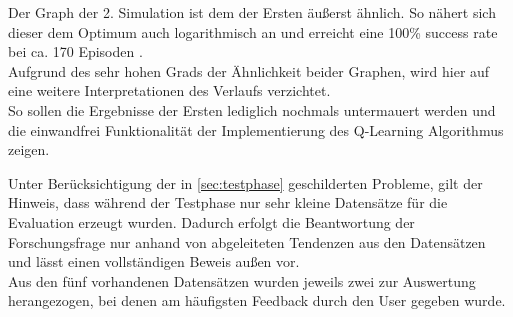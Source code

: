 Der Graph der 2. Simulation ist dem der Ersten äußerst ähnlich. So nähert sich dieser dem Optimum auch logarithmisch an und erreicht eine 100\% success rate bei ca. 170 Episoden .\\
Aufgrund des sehr hohen Grads der Ähnlichkeit beider Graphen, wird hier auf eine weitere Interpretationen des Verlaufs verzichtet. \\
So sollen die Ergebnisse der Ersten lediglich nochmals untermauert werden und die einwandfrei Funktionalität der Implementierung des Q-Learning Algorithmus zeigen. 

Unter Berücksichtigung der in \ref{sec:testphase} geschilderten Probleme, gilt der Hinweis, dass während der Testphase nur sehr kleine Datensätze für die Evaluation erzeugt wurden. Dadurch erfolgt die Beantwortung der Forschungsfrage nur anhand von abgeleiteten Tendenzen aus den Datensätzen und lässt einen vollständigen Beweis außen vor.  \\
Aus den fünf vorhandenen Datensätzen wurden jeweils zwei zur Auswertung herangezogen, bei denen am häufigsten Feedback durch den User gegeben wurde. \\





